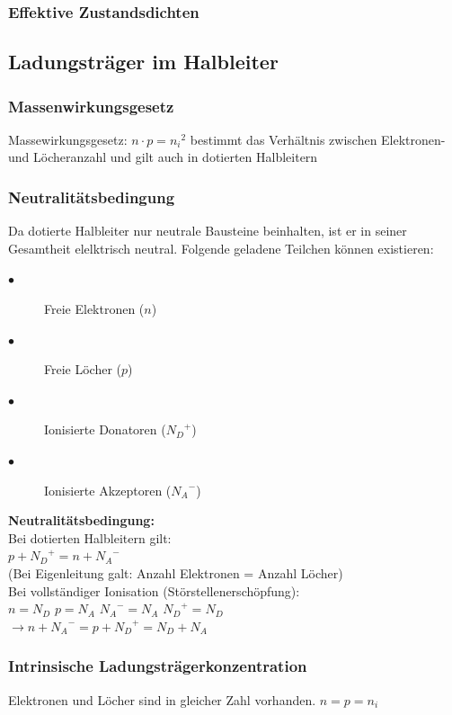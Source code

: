 			
	\subsubsection{Effektive Zustandsdichten}	
		
		
\subsection{Ladungsträger im Halbleiter}
		
	\subsubsection{Massenwirkungsgesetz}
		Massewirkungsgesetz: $n \cdot p = {n_i}^2$
		bestimmt das Verhältnis zwischen Elektronen- und Löcheranzahl und gilt auch in dotierten Halbleitern
	\subsubsection{Neutralitätsbedingung}
		Da dotierte Halbleiter nur neutrale Bausteine beinhalten, ist er in seiner Gesamtheit elelktrisch neutral.
		Folgende geladene Teilchen können existieren:
		\begin{description}
			\item[$\bullet$] Freie Elektronen ($n$)
			\item[$\bullet$] Freie Löcher ($p$)
			\item[$\bullet$] Ionisierte Donatoren (${N_D}^+$)
			\item[$\bullet$] Ionisierte Akzeptoren (${N_A}^-$)
		\end{description}
		\textbf{Neutralitätsbedingung:}\\
		Bei dotierten Halbleitern gilt:\\
		$p + {N_D}^+ = n + {N_A}^-$\\
		
		(Bei Eigenleitung galt: Anzahl Elektronen = Anzahl Löcher)\\
		
		Bei vollständiger Ionisation (Störstellenerschöpfung):\\
		$n = N_D$ $p = N_A$ ${N_A}^- = N_A$ ${N_D}^+ = N_D$\\
		$\rightarrow n + {N_A}^- = p + {N_D}^+ = N_D + N_A$
			
	
	\subsubsection{Intrinsische Ladungsträgerkonzentration}
		Elektronen und Löcher sind in gleicher Zahl vorhanden.
		$n = p = n_i$
